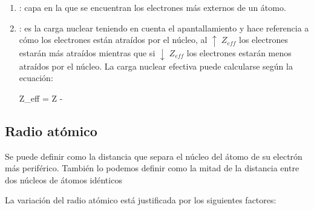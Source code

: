 \begin{enumerate}[label=\numberballmDarkTeal]
        El efecto pantalla no tiene sentido estimarlo entre los elementos de un mismo periodo porque todos los elementos tienen la misma última capa llena.
        El efecto pantalla si tiene sentido estudiarlo entre los elementos de un mismo grupo, ya que al ir bajando en el grupo, aumentará los niveles energéticos llenados y, por tanto, el apantallamiento es mayor.
        \item {}: capa en la que se encuentran los electrones más externos de un átomo.
        \item {}: es la carga nuclear teniendo en cuenta el apantallamiento y hace referencia a cómo los electrones están atraídos por el núcleo, al $\uparrow\;Z_{eff}$ los electrones estarán más atraídos mientras que si $\downarrow\;Z_{eff}$ los electrones estarán menos atraídos por el núcleo.
        La carga nuclear efectiva puede calcularse según la ecuación:
        \begin{centeredequation}
            Z_{eff} = Z - \sigma
        \end{centeredequation}

\end{enumerate}

\subsection{Radio atómico}\label{subsec:radio-atomico}

\begin{center}
    \begin{definition}
        Se puede definir como la distancia que separa el núcleo del átomo de su electrón más periférico.
        También lo podemos definir como la mitad de la distancia entre dos núcleos de átomos idénticos
    \end{definition}
\end{center}

La variación del radio atómico está justificada por los siguientes factores:

